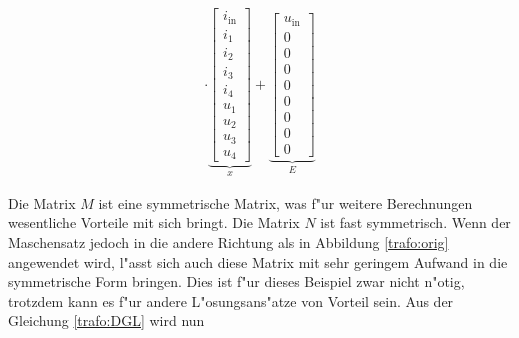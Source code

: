 \begin{refsection}
{\begin{align}
			\cdot
			\underbrace{\begin{bmatrix}
			i_\mathrm{in} \\
			i_1 \\
			i_2 \\
			i_3 \\
			i_4 \\
			u_1 \\
			u_2 \\
			u_3 \\
			u_4
			\end{bmatrix}}_{\text{$x$}}
			+
			\underbrace{\begin{bmatrix}
			u_\mathrm{in} \\
			0 \\
			0 \\
			0 \\
			0 \\
			0 \\
			0 \\
			0 \\
			0
			\end{bmatrix}}_{\text{$E$}}
			\label{trafo:DGL}
\end{align}
}
		


Die Matrix $M$ ist eine symmetrische Matrix, was f"ur weitere Berechnungen wesentliche Vorteile mit sich bringt. Die Matrix $N$ ist fast symmetrisch. Wenn der Maschensatz jedoch in die andere Richtung als in Abbildung \ref{trafo:orig} angewendet wird, l"asst sich auch diese Matrix mit sehr geringem Aufwand in die symmetrische Form bringen. Dies ist f"ur dieses Beispiel zwar nicht n"otig, trotzdem kann es f"ur andere L"osungsans"atze von Vorteil sein. Aus der Gleichung \ref{trafo:DGL} wird nun 


\end{refsection}
